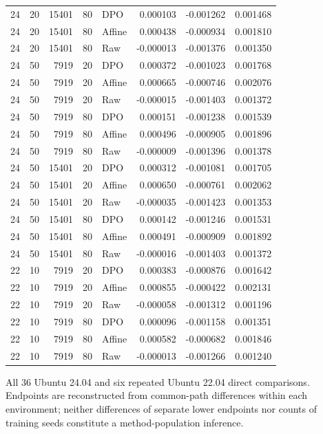 \begin{longtable}{lrrrlrrr}
24 & 20 & 15401 & 80 & DPO & 0.000103 & -0.001262 & 0.001468\\
24 & 20 & 15401 & 80 & Affine & 0.000438 & -0.000934 & 0.001810\\
24 & 20 & 15401 & 80 & Raw & -0.000013 & -0.001376 & 0.001350\\
24 & 50 & 7919 & 20 & DPO & 0.000372 & -0.001023 & 0.001768\\
24 & 50 & 7919 & 20 & Affine & 0.000665 & -0.000746 & 0.002076\\
24 & 50 & 7919 & 20 & Raw & -0.000015 & -0.001403 & 0.001372\\
24 & 50 & 7919 & 80 & DPO & 0.000151 & -0.001238 & 0.001539\\
24 & 50 & 7919 & 80 & Affine & 0.000496 & -0.000905 & 0.001896\\
24 & 50 & 7919 & 80 & Raw & -0.000009 & -0.001396 & 0.001378\\
24 & 50 & 15401 & 20 & DPO & 0.000312 & -0.001081 & 0.001705\\
24 & 50 & 15401 & 20 & Affine & 0.000650 & -0.000761 & 0.002062\\
24 & 50 & 15401 & 20 & Raw & -0.000035 & -0.001423 & 0.001353\\
24 & 50 & 15401 & 80 & DPO & 0.000142 & -0.001246 & 0.001531\\
24 & 50 & 15401 & 80 & Affine & 0.000491 & -0.000909 & 0.001892\\
24 & 50 & 15401 & 80 & Raw & -0.000016 & -0.001403 & 0.001372\\
22 & 10 & 7919 & 20 & DPO & 0.000383 & -0.000876 & 0.001642\\
22 & 10 & 7919 & 20 & Affine & 0.000855 & -0.000422 & 0.002131\\
22 & 10 & 7919 & 20 & Raw & -0.000058 & -0.001312 & 0.001196\\
22 & 10 & 7919 & 80 & DPO & 0.000096 & -0.001158 & 0.001351\\
22 & 10 & 7919 & 80 & Affine & 0.000582 & -0.000682 & 0.001846\\
22 & 10 & 7919 & 80 & Raw & -0.000013 & -0.001266 & 0.001240\\
\bottomrule\end{longtable}
\noindent All 36 Ubuntu 24.04 and six repeated Ubuntu 22.04 direct comparisons. Endpoints are reconstructed from common-path differences within each environment; neither differences of separate lower endpoints nor counts of training seeds constitute a method-population inference.
\endgroup
